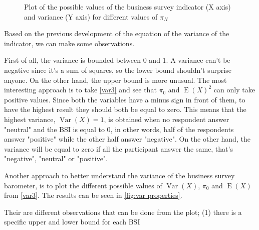 \documentclass[12pt,a4paper,oneside]{book}
\DeclareMathOperator{\Var}{Var}
\DeclareMathOperator{\E}{E}
\begin{document}
\begin{figure}[hbt!]
    \caption{Plot of the possible values of the business survey indicator (X axis) and variance (Y axis) for different values of $\pi_N$ }
    \label{fig:var properties}
\end{figure}


Based on the previous development of the equation of the variance of the indicator, we can make some observations.

First of all, the variance is bounded between 0 and 1. 
A variance can't be negative since it's a sum of squares, so the lower bound shouldn't surprise anyone. On the other hand, the upper bound is more unusual. The most interesting approach is to take  \autoref{var3} and see that $\pi_0$ and $\E(X)^2$ can only take positive values. Since both the variables have a minus sign in front of them, to have the highest result they should both be equal to zero. 
This means that the highest variance, $\Var(X)=1$, is obtained when no respondent answer "neutral" and the BSI is equal to 0, in other words, half of the respondents answer "positive" while the other half answer "negative". 
On the other hand, the variance will be equal to zero if all the participant answer the same, that's "negative", "neutral" or "positive".

Another approach to better understand the variance of the business survey barometer, is to plot the different possible values of $\Var(X)$, $\pi_0$ and $\E(X)$ from \autoref{var3}. The results can be seen in \autoref{fig:var properties}.

Their are different observations that can be done from the plot;
(1) there is a specific upper and lower bound for each BSI
\end{document}
